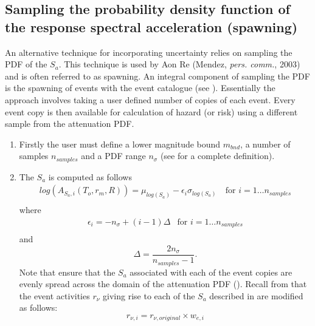 \subsection{Sampling the probability density function of
the response spectral acceleration (spawning)} \label{attn:uncert-pdfchoice}


An alternative technique for incorporating uncertainty relies on
sampling the PDF of the $S_a$. This technique is used by Aon Re
(Mendez, \textit{pers. comm.}, 2003) and is often referred to as
spawning. An integral component of sampling the PDF is the spawning
of events with the event catalogue (see ).
Essentially the approach involves taking a user defined number of
copies of each event. Every event copy is then available for
calculation of hazard (or risk) using a different sample from the
attenuation PDF.
\begin{enumerate}
\item Firstly the user must define a lower magnitude bound
$m_{bnd}$, a number of samples $n_{samples}$ and a PDF range
$n_\sigma$ (see  for a complete definition).
\item The $S_a$ is computed as follows
\begin{equation}
\label{attn:uncertainty-pdfsample}
\begin{array}{ll}
log(A_{S_a,i}(T_o,r_m,R)) = \mu_{log(S_a)} - \epsilon_i
\sigma_{log(S_a)}\ & \textrm{for $i=1 \ldots
n_{samples}$} \\
\end{array}
\end{equation}
where
\begin{equation}
\label{attn:uncertainty-def-epsilon}
\begin{array}{ll}
\epsilon_i = -n_\sigma + (i-1)\Delta &
\textrm{for $i=1 \ldots n_{samples}$} \\
\end{array}
\end{equation}
and
\begin{equation}
\Delta = \frac{2n_\sigma}{n_{samples}-1}.
\end{equation}
Note that
ensure that the $S_a$ associated with each of the event copies are
evenly spread across the domain of the attenuation PDF
(). Recall from 
that the event activities $r_\nu$ giving rise to each of the $S_a$
described in  are modified as
follows:
\begin{equation}
r_{\nu,i} = r_{\nu,original} \times w_{e,i}
\end{equation}
\end{enumerate}

